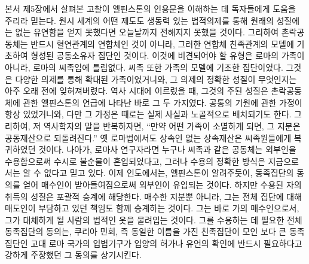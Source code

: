 본서 제5장에서 살펴본 고찰이 엘핀스톤의 인용문을 이해하는 데
독자들에게 도움을 주리라 믿는다.
원시 세계의 어떤 제도도
생동력 있는 법적의제를 통해
원래의 성질에는 없는 유연함을
얻지 못했다면
오늘날까지 전해지지 못했을 것이다.
그리하여 촌락공동체는 반드시 혈연관계의 연합체인 것이 아니라,
그러한 연합체 친족관계의 모델에 기초하여 형성된
공동소유자 집단인 것이다.
이것에 비견되어야 할 유형은 로마의 가족이 아니라,
로마의 씨족임에 틀림없다.
씨족 또한 가족의 모델에 기초한 집단이었다.
그것은 다양한 의제를 통해 확대된 가족이었거니와,
그 의제의 정확한 성질이 무엇인지는 아주 오래 전에 잊혀져버렸다.
역사 시대에 이르렀을 때, 그것의 주된 성질은
촌락공동체에 관한 엘핀스톤의 언급에 나타난 바로 그 두 가지였다.
공통의 기원에 관한 가정이 항상 있었거니와,
다만 그 가정은 때로는 실제 사실과 노골적으로 배치되기도 한다.
그리하여, 저 역사학자의 말을 반복하자면,
``만약 어떤 가족이 소멸하게 되면, 그 지분은 공동재산으로 되돌려진다.''
옛 로마법에서도 상속인 없는 상속재산은
씨족원들에게 복귀하였던 것이다.
나아가, 로마사 연구자라면 누구나
씨족과 같은 공동체는 외부인을 수용함으로써 수시로 불순물이 혼입되었다고,
그러나 수용의 정확한 방식은 지금으로서는 알 수 없다고 믿고 있다.
이제 인도에서는, 엘핀스톤이 알려주듯이,
동족집단의 동의를 얻어 매수인이 받아들여짐으로써
외부인이 유입되는 것이다.
하지만 수용된 자의 취득의 성질은
포괄적 승계에 해당한다.
매수한 지분뿐 아니라,
그는
전체 집단에 대해 매도인이 부담하고 있던 책임도
함께
승계하는 것이다.
그는 바로 가의 매수인으로서,
그가 대체하게 될 사람의 법적인 옷\hanja{[衣服]}을 물려입는 것이다.
그를 수용하는 데 필요한 전체 동족집단의 동의는,
쿠리아 민회, 즉
동일한 이름을 가진 친족집단이 모인 보다 큰 동족집단인 고대 로마 국가의
입법기구가
입양의 허가나 유언의 확인에 반드시 필요하다고 강하게 주장했던
그 동의를 상기시킨다.


